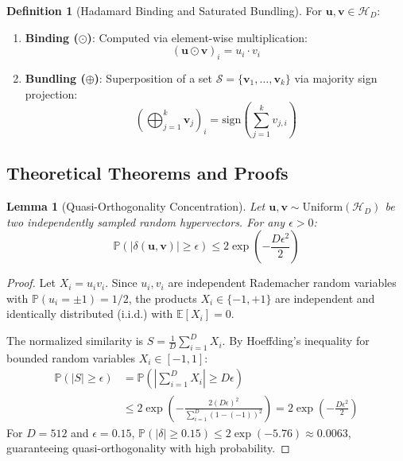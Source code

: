\documentclass[11pt,a4paper]{article}
\theoremstyle{plain}
\newtheorem{lemma}[theorem]{Lemma}
\theoremstyle{definition}
\newtheorem{definition}[theorem]{Definition}
\theoremstyle{remark}
\begin{document}
\begin{definition}[Hadamard Binding and Saturated Bundling]
For $\bm{u}, \bm{v} \in \mathcal{H}_D$:
\begin{enumerate}
    \item \textbf{Binding ($\odot$)}: Computed via element-wise multiplication:
    \begin{equation}
    (\bm{u} \odot \bm{v})_i = u_i \cdot v_i
    \end{equation}
    \item \textbf{Bundling ($\oplus$)}: Superposition of a set $\mathcal{S} = \{\bm{v}_1, \dots, \bm{v}_k\}$ via majority sign projection:
    \begin{equation}
    \left(\bigoplus_{j=1}^k \bm{v}_j\right)_i = \text{sign}\left(\sum_{j=1}^k v_{j, i}\right)
    \end{equation}
\end{enumerate}
\end{definition}

\subsection{Theoretical Theorems and Proofs}

\begin{lemma}[Quasi-Orthogonality Concentration]
\label{lem:quasi_ortho}
Let $\bm{u}, \bm{v} \sim \text{Uniform}(\mathcal{H}_D)$ be two independently sampled random hypervectors. For any $\epsilon > 0$:
\begin{equation}
\mathbb{P}\left(|\delta(\bm{u}, \bm{v})| \ge \epsilon\right) \le 2 \exp\left(-\frac{D \epsilon^2}{2}\right)
\end{equation}
\end{lemma}

\begin{proof}
Let $X_i = u_i v_i$. Since $u_i, v_i$ are independent Rademacher random variables with $\mathbb{P}(u_i = \pm 1) = 1/2$, the products $X_i \in \{-1, +1\}$ are independent and identically distributed (i.i.d.) with $\mathbb{E}[X_i] = 0$. 

The normalized similarity is $S = \frac{1}{D} \sum_{i=1}^D X_i$. By Hoeffding's inequality for bounded random variables $X_i \in [-1, 1]$:
\begin{align}
\mathbb{P}(|S| \ge \epsilon) &= \mathbb{P}\left(\left|\sum_{i=1}^D X_i\right| \ge D \epsilon\right) \nonumber \\
&\le 2 \exp\left(-\frac{2(D\epsilon)^2}{\sum_{i=1}^D (1 - (-1))^2}\right) = 2 \exp\left(-\frac{D \epsilon^2}{2}\right)
\end{align}
For $D = 512$ and $\epsilon = 0.15$, $\mathbb{P}(|\delta| \ge 0.15) \le 2 \exp(-5.76) \approx 0.0063$, guaranteeing quasi-orthogonality with high probability.
\end{proof}
\end{document}
